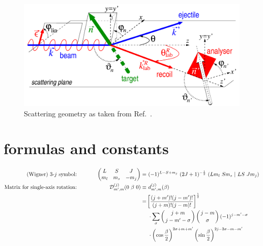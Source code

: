 \begin{figure}
  \includegraphics[width=\columnwidth]{kinematics}

  \caption{\label{fig.kinemat} Scattering geometry as taken from Ref.~\cite{Griesshammer:2017txw}.}
\end{figure}


\newpage

\section{formulas and constants}

\begin{alignat}{2}
\text{(Wigner) 3-$j$ symbol:} &\hspace{1cm}& \begin{pmatrix}L & S & J\\m_l&m_s&-m_j \end{pmatrix}=&~(-1)^{L-S+m_j}~(2J+1)^{-\frac{1}{2}}~(Lm_l~Sm_s~\vert~LS~Jm_j)\\
\text{Matrix for single-axis rotation:} &\hspace{1cm}&   \mathcal{D}_{m^\prime,m}^{(j)}(0~\beta~0)\equiv&~d_{m^\prime,m}^{(j)}(\beta)\nonumber\\
&\hspace{1cm}& =&\left[\frac{(j+m^\prime)!(j-m^\prime)!}{(j+m)!(j-m)!}\right]^\frac{1}{2}\nonumber\\
&\hspace{1cm}&&~\cdot\sum_\sigma\left(j+m\atop j-m^\prime-\sigma\right)\left(j-m\atop \sigma\right)(-1)^{j-m^\prime-\sigma}\nonumber\\
&\hspace{1cm}&&~\cdot\left(\cos\frac{\beta}{2}\right)^{2\sigma+m+m^\prime}\left(\sin\frac{\beta}{2}\right)^{2j-2\sigma-m-m^\prime}
\end{alignat}



